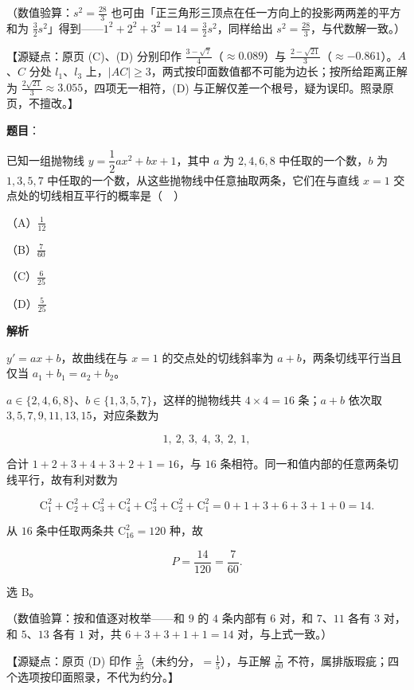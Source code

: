 \begin{answer}
（数值验算：$s^{2}=\frac{28}{3}$ 也可由「正三角形三顶点在任一方向上的投影两两差的平方和为 $\frac32s^{2}$」得到——$1^{2}+2^{2}+3^{2}=14=\frac32s^{2}$，同样给出 $s^{2}=\frac{28}{3}$，与代数解一致。）

【源疑点：原页 (C)、(D) 分别印作 $\frac{3-\sqrt7}{4}$（$\approx0.089$）与 $\frac{2-\sqrt{21}}{3}$（$\approx-0.861$）。$A$、$C$ 分处 $l_1$、$l_3$ 上，$|AC|\geqslant3$，两式按印面数值都不可能为边长；按所给距离正解为 $\frac{2\sqrt{21}}{3}\approx3.055$，四项无一相符，(D) 与正解仅差一个根号，疑为误印。照录原页，不擅改。】


\end{answer}
\begin{answer}

\textbf{题目}：

已知一组抛物线 $y=\dfrac12ax^2+bx+1$，其中 $a$ 为 $2,4,6,8$ 中任取的一个数，$b$ 为 $1,3,5,7$ 中任取的一个数，从这些抛物线中任意抽取两条，它们在与直线 $x=1$ 交点处的切线相互平行的概率是（　）

（A）$\frac1{12}$

（B）$\frac{7}{60}$

（C）$\frac6{25}$

（D）$\frac5{25}$

\textbf{解析}

$y'=ax+b$，故曲线在与 $x=1$ 的交点处的切线斜率为 $a+b$，两条切线平行当且仅当 $a_1+b_1=a_2+b_2$。

$a\in\{2,4,6,8\}$、$b\in\{1,3,5,7\}$，这样的抛物线共 $4\times4=16$ 条；$a+b$ 依次取 $3,5,7,9,11,13,15$，对应条数为

\nopagebreak[4]
\[1,\ 2,\ 3,\ 4,\ 3,\ 2,\ 1,\]

合计 $1+2+3+4+3+2+1=16$，与 $16$ 条相符。同一和值内部的任意两条切线平行，故有利对数为

\nopagebreak[4]
\[\mathrm{C}_1^2+\mathrm{C}_2^2+\mathrm{C}_3^2+\mathrm{C}_4^2+\mathrm{C}_3^2+\mathrm{C}_2^2+\mathrm{C}_1^2=0+1+3+6+3+1+0=14 .\]

从 $16$ 条中任取两条共 $\mathrm{C}_{16}^{2}=120$ 种，故

\nopagebreak[4]
\[P=\frac{14}{120}=\frac{7}{60}.\]

选 B。

（数值验算：按和值逐对枚举——和 $9$ 的 $4$ 条内部有 $6$ 对，和 $7$、$11$ 各有 $3$ 对，和 $5$、$13$ 各有 $1$ 对，共 $6+3+3+1+1=14$ 对，与上式一致。）

【源疑点：原页 (D) 印作 $\frac{5}{25}$（未约分，$=\frac15$），与正解 $\frac{7}{60}$ 不符，属排版瑕疵；四个选项按印面照录，不代为约分。】


\end{answer}
